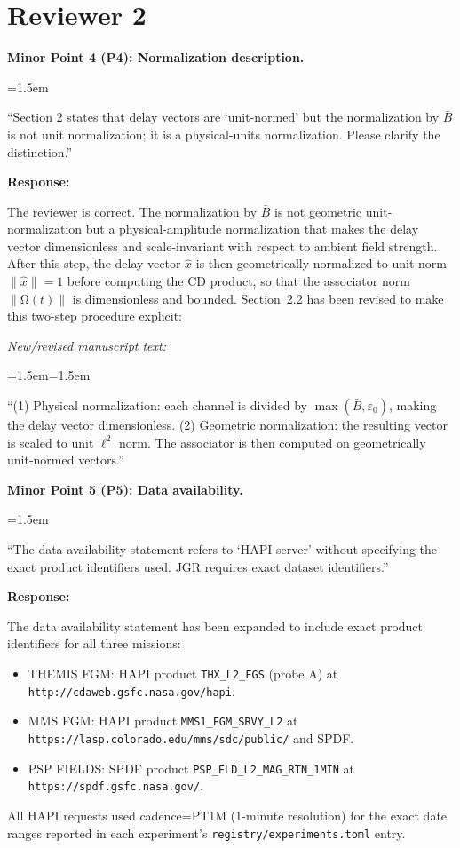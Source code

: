 \documentclass{article}
\newcommand{\Assoc}{\mathrm{\Omega}}
\newenvironment{reviewcomment}[1]{%
  \vspace{0.5em}
  \noindent\textbf{#1}\par\vspace{0.2em}
  \begin{list}{}{\leftmargin=1.5em}\item\itshape
}{%
  \end{list}\vspace{0.5em}
}
\newenvironment{authorresponse}{%
  \vspace{0.3em}
  \noindent\textbf{Response:}\hspace{0.5em}
}{%
  \vspace{0.5em}\par
}
\newenvironment{newtext}{%
  \vspace{0.3em}
  \noindent\textit{New/revised manuscript text:}\par\medskip
  \begin{list}{}{\leftmargin=1.5em\rightmargin=1.5em}
  \item\small
}{%
  \end{list}\vspace{0.3em}
}
\begin{document}
\clearpage

\section*{Reviewer 2}

\begin{reviewcomment}{Minor Point 4 (P4): Normalization description.}
``Section 2 states that delay vectors are `unit-normed' but the
normalization by $\bar{B}$ is not unit normalization; it is a
physical-units normalization.  Please clarify the distinction.''
\end{reviewcomment}

\begin{authorresponse}
The reviewer is correct.  The normalization by $\bar{B}$ is not geometric
unit-normalization but a physical-amplitude normalization that makes the
delay vector dimensionless and scale-invariant with respect to ambient
field strength.  After this step, the delay vector $\hat{x}$ is then
geometrically normalized to unit norm $\|\hat{x}\| = 1$ before computing
the CD product, so that the associator norm $\|\Assoc(t)\|$ is
dimensionless and bounded.  Section~2.2 has been revised to make this
two-step procedure explicit:

\begin{newtext}
``(1) Physical normalization: each channel is divided by
$\max(\bar{B}, \varepsilon_0)$, making the delay vector dimensionless.
(2) Geometric normalization: the resulting vector is scaled to
unit $\ell^2$ norm.  The associator is then computed on geometrically
unit-normed vectors.''
\end{newtext}
\end{authorresponse}

\begin{reviewcomment}{Minor Point 5 (P5): Data availability.}
``The data availability statement refers to `HAPI server' without specifying
the exact product identifiers used.  JGR requires exact dataset identifiers.''
\end{reviewcomment}

\begin{authorresponse}
The data availability statement has been expanded to include exact
product identifiers for all three missions:
\begin{itemize}
  \item THEMIS FGM: HAPI product \texttt{THX\_L2\_FGS} (probe A) at
    \texttt{http://cdaweb.gsfc.nasa.gov/hapi}.
  \item MMS FGM: HAPI product \texttt{MMS1\_FGM\_SRVY\_L2} at
    \texttt{https://lasp.colorado.edu/mms/sdc/public/} and SPDF.
  \item PSP FIELDS: SPDF product \texttt{PSP\_FLD\_L2\_MAG\_RTN\_1MIN}
    at \texttt{https://spdf.gsfc.nasa.gov/}.
\end{itemize}
All HAPI requests used cadence=PT1M (1-minute resolution) for the
exact date ranges reported in each experiment's
\texttt{registry/experiments.toml} entry.
\end{authorresponse}
\end{document}
